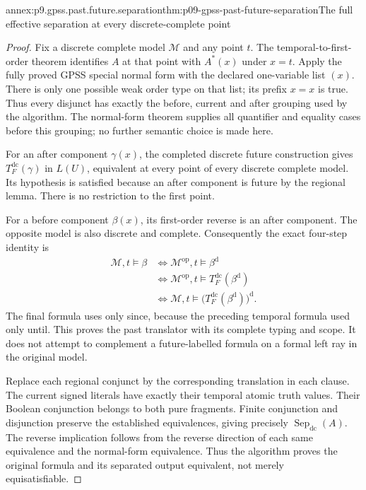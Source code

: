 \begin{annexitem}{annex:p9.gpss.past.future.separation}{thm:p09-gpss-past-future-separation}{The full effective separation at every discrete-complete point}
\begin{proof}
Fix a discrete complete model
\(\mathcal M\) and any point \(t\).
The temporal-to-first-order theorem
identifies \(A\) at that point
with \(A^*(x)\) under \(x=t\).
Apply the fully proved GPSS
special normal form with the
declared one-variable list \((x)\).
There is only one possible weak
order type on that list; its
prefix \(x=x\) is true. Thus
every disjunct has exactly the
before, current and after
grouping used by the algorithm.
The normal-form theorem supplies
all quantifier and equality
cases before this grouping;
no further semantic choice
is made here.

For an after component
\(\gamma(x)\), the completed
discrete future construction
gives \(T_F^{\mathrm{dc}}(\gamma)\)
in \(L(U)\), equivalent at
every point of every
discrete complete model.
Its hypothesis is satisfied
because an after component
is future by the regional
lemma. There is no restriction
to the first point.

For a before component
\(\beta(x)\), its first-order
reverse is an after component.
The opposite model is also
discrete and complete.
Consequently the exact
four-step identity is
\[
\begin{aligned}
 \mathcal M,t\models\beta
 &\Longleftrightarrow
       \mathcal M^{\mathrm{op}},t\models\beta^{\mathrm d}\\
 &\Longleftrightarrow
       \mathcal M^{\mathrm{op}},t\models
                    T_F^{\mathrm{dc}}(\beta^{\mathrm d})\\
 &\Longleftrightarrow
       \mathcal M,t\models
          \bigl(T_F^{\mathrm{dc}}(\beta^{\mathrm d})\bigr)^{\mathrm d}.
\end{aligned}
\]
The final formula uses only since,
because the preceding temporal
formula used only until.
This proves the past translator
with its complete typing and
scope. It does not attempt to
complement a future-labelled
formula on a formal left ray
in the original model.

Replace each regional conjunct
by the corresponding translation
in each clause. The current
signed literals have exactly
their temporal atomic truth
values. Their Boolean conjunction
belongs to both pure fragments.
Finite conjunction and disjunction
preserve the established
equivalences, giving precisely
\(\operatorname{Sep}_{\mathrm{dc}}(A)\).
The reverse implication follows
from the reverse direction of
each same equivalence and
the normal-form equivalence.
Thus the algorithm proves
the original formula and
its separated output equivalent,
not merely equisatisfiable.


\end{proof}
\end{annexitem}
